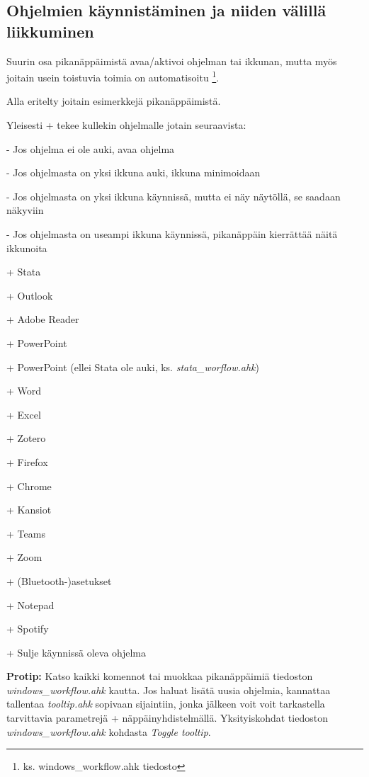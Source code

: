 \documentclass[a4paper,12pt]{scrartcl}
\begin{document}
\subsection{Ohjelmien käynnistäminen ja niiden välillä liikkuminen}\label{roar}

Suurin osa pikanäppäimistä avaa/aktivoi ohjelman tai ikkunan, mutta myös joitain usein toistuvia toimia on automatisoitu \footnote{ks. windows\_workflow.ahk tiedosto}.

\medskip

Alla eritelty joitain esimerkkejä pikanäppäimistä.

Yleisesti + tekee kullekin ohjelmalle jotain seuraavista:

- Jos ohjelma ei ole auki, avaa ohjelma

- Jos ohjelmasta on yksi ikkuna auki, ikkuna minimoidaan

- Jos ohjelmasta on yksi ikkuna käynnissä, mutta ei näy näytöllä, se saadaan näkyviin

- Jos ohjelmasta on useampi ikkuna käynnissä, pikanäppäin kierrättää näitä ikkunoita

\medskip

+ Stata

+ Outlook

+ Adobe Reader

+\keys{\S} PowerPoint

+\menu{<} PowerPoint (ellei Stata ole auki, ks. \emph{stata\_worflow.ahk})

+ Word

+ Excel

+ Zotero

+ Firefox

+\keys{\shift} Chrome

+ Kansiot

+ Teams

+ Zoom

+ (Bluetooth-)asetukset

+ Notepad

+ Spotify

+ Sulje käynnissä oleva ohjelma

\textbf{Protip:} Katso kaikki komennot tai muokkaa pikanäppäimiä tiedoston \emph{windows\_workflow.ahk} kautta. Jos haluat lisätä uusia ohjelmia, kannattaa tallentaa \emph{tooltip.ahk} sopivaan sijaintiin, jonka jälkeen voit voit tarkastella tarvittavia parametrejä + näppäinyhdistelmällä. Yksityiskohdat tiedoston \emph{windows\_workflow.ahk} kohdasta \emph{Toggle tooltip}.
\end{document}
